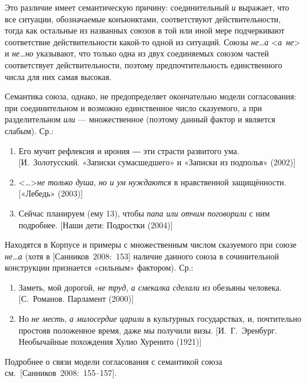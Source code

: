 Это различие имеет семантическую причину: соединительный \textit{и}
выражает, что все ситуации, обозначаемые конъюнктами, соответствуют
действительности, тогда как остальные из названных союзов в той или иной
мере подчеркивают соответствие действительности какой-то одной из
ситуаций. Союзы \textit{не\ldots а} \textless{}\textit{а~не}\textgreater{} и
\textit{не\ldots но} указывают, что только одна из двух соединяемых союзом
частей соответствует действительности, поэтому предпочтительность
единственного числа для них самая высокая.

Семантика союза, однако, не предопределяет окончательно модели
согласования: при соединительном и возможно единственное число
сказуемого, а при разделительном \textit{или} --- множественное (поэтому
данный фактор и является слабым). Ср.:

\begin{enumerate}
\def\labelenumi{(\arabic{enumi})}
\setcounter{enumi}{105}
\item
  Его мучит рефлексия и ирония ― эти страсти развитого ума.
  {[}И.~Золотусский. «Записки сумасшедшего» и «Записки из подполья»
  (2002){]}
\item
  \textless\ldots\textgreater{}\textit{не только душа}, \textit{но и ум
  нуждаются} в нравственной защищённости. {[}«Лебедь» (2003){]}
\item
  Сейчас планируем (ему 13), чтобы \textit{папа или отчим поговорили} с
  ним подробнее. {[}Наши дети: Подростки (2004){]}
\end{enumerate}

Находятся в Корпусе и примеры с множественным числом сказуемого при
союзе \textit{не\ldots а} (хотя в {[}Санников~2008:~153{]} наличие данного
союза в сочинительной конструкции признается «сильным» фактором). Ср.:

\begin{enumerate}
\def\labelenumi{(\arabic{enumi})}
\setcounter{enumi}{108}
\item
  Заметь, мой дорогой, \textit{не труд}, \textit{а смекалка сделали} из
  обезьяны человека. {[}С.~Романов. Парламент (2000){]}
\item
  Но \textit{не месть}, \textit{а милосердие царили} в культурных
  государствах, и, почтительно простояв положенное время, даже мы
  получили визы. {[}И.~Г.~Эренбург. Необычайные похождения Хулио
  Хуренито (1921){]}
\end{enumerate}

Подробнее о связи модели согласования с семантикой союза
см.~{[}Санников~2008:~155--157{]}.

